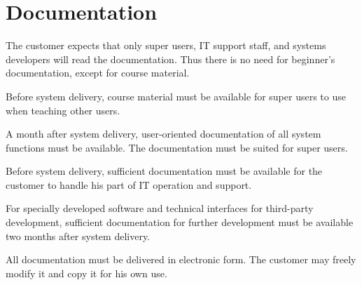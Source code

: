 \documentclass[Main]{subfiles}
\begin{document}
\section{Documentation}
The customer expects that only super users, IT support staff, and systems developers will read the documentation. 
Thus there is no need for beginner's documentation, except for course material.


\begin{DocTable}
\Doc
{Before system delivery, course material must be available for super users to use when teaching other users.}
{}
{}

\Doc
{A month after system delivery, user-oriented documentation of all system functions must be available. 
The documentation must be suited for super users.}
{}
{}

\Doc
{Before system delivery, sufficient documentation must be available for the customer to handle his part of IT operation and support. }
{}
{}

\Doc
{For specially developed software and technical interfaces for third-party development, sufficient documentation for further development must be available two months after system delivery. }
{}
{}

\Doc
{All documentation must be delivered in electronic form. 
The customer may freely modify it and copy it for his own use. }
{}
{}

\end{DocTable}
\end{document}
